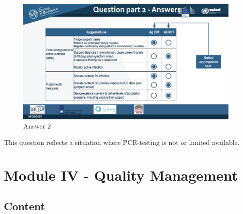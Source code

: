 \documentclass[
]{book}
\begin{document}
\begin{figure}
\centering
\includegraphics{images/m03/m03_questions_v2.004.jpeg}
\caption{Answer 2}
\end{figure}

This question reflects a situation where PCR-testing is not or limited available.

\hypertarget{module-iv---quality-management}{%
\section{Module IV - Quality Management}\label{module-iv---quality-management}}

\hypertarget{content-2}{%
\subsection{Content}\label{content-2}}
\end{document}
